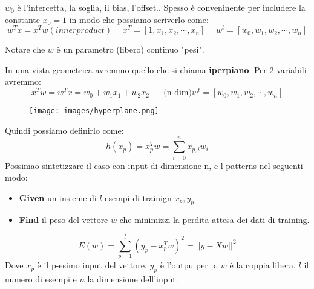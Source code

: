 \hspace{-15pt}$w_0$ è l'intercetta, la soglia, il bias, l'offset.. Spesso è conveninente per includere la constante $x_0 = 1$ 
in modo che possiamo scriverlo come:
$$w^T x = x^T w (inner product) \hspace{15pt}x^T = [1, x_1, x_2, \cdots, x_n] \hspace{15pt} w^t = [w_0, w_1, w_2, \cdots, w_n]$$
\begin{note}
    Notare che $w$ è un parametro (libero) continuo "pesi".
\end{note}
\newpage
\hspace{-15pt}In una vista geometrica avremmo quello che si chiama \textbf{iperpiano}. Per 2 variabili avremmo:
$$x^T w = w^T x = w_0 + w_1 x_1 + w_2 x_2 \hspace{20pt} \text{(n dim)} w^t = [w_0, w_1, w_2, \cdots, w_n]$$
\begin{figure}[h!]
    \centering
    \texttt{[image: images/hyperplane.png]}
\end{figure}
Quindi possiamo definirlo come:
$$h(x_p) = x_p^T w = \sum_{i=0}^{n}x_{p,i} w_i$$
Possimao sintetizzare il caso con input di dimensione n, e l patterns nel seguenti modo:
\begin{itemize}
    \item \textbf{Given} un insieme di $l$ esempi di trainign $x_p, y_p$
    \item \textbf{Find} il peso del vettore $w$ che minimizzi la perdita attesa dei dati di training.
\end{itemize}
$$E(w) = \sum_{p=1}^{l}(y_p - x_p^T w)^2 = ||y - Xw||^2$$
Dove $x_p$ è il p-esimo input del vettore, $y_p$ è l'outpu per p, $w$ è la coppia libera, $l$ il numero
di esempi e $n$ la dimensione dell'input.


